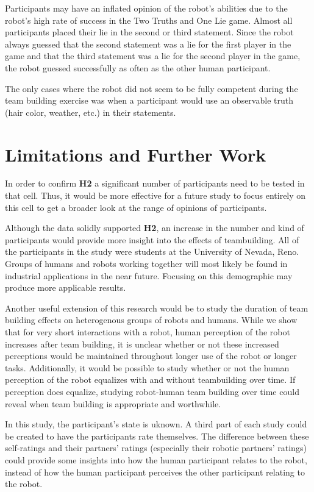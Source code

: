 \documentclass{acm_proc_article-sp}
\begin{document}
Participants may have an inflated opinion of the robot's abilities due to the robot's high rate of success in the Two Truths and One Lie game. Almost all participants placed their lie in the second or third statement. Since the robot always guessed that the second statement was a lie for the first player in the game and that the third statement was a lie for the second player in the game, the robot guessed successfully as often as the other human participant. 

The only cases where the robot did not seem to be fully competent during the team building exercise was when a participant would use an observable truth (hair color, weather, etc.) in their statements. 

\section{Limitations and Further Work}
\label{section:limitations-and-further-work}
In order to confirm \textbf{H2} a significant number of participants need to be tested in that cell. Thus, it would be more effective for a future study to focus entirely on this cell to get a broader look at the range of opinions of participants.

Although the data solidly supported \textbf{H2}, an increase in the number and kind of participants would provide more insight into the effects of teambuilding. All of the participants in the study were students at the University of Nevada, Reno. Groups of humans and robots working together will most likely be found in industrial applications in the near future. Focusing on this demographic may produce more applicable results. 

Another useful extension of this research would be to study the duration of team building effects on heterogenous groups of robots and humans. While we show that for very short interactions with a robot, human perception of the robot increases after team building, it is unclear whether or not these increased perceptions would be maintained throughout longer use of the robot or longer tasks. Additionally, it would be possible to study whether or not the human perception of the robot equalizes with and without teambuilding over time. If perception does equalize, studying robot-human team building over time could reveal when team building is appropriate and worthwhile. 

In this study, the participant's state is uknown. A third part of each study could be created to have the participants rate themselves. The difference between these self-ratings and their partners' ratings (especially their robotic partners' ratings) could provide some insights into how the human participant relates to the robot, instead of how the human participant perceives the other participant relating to the robot. 
\end{document}

